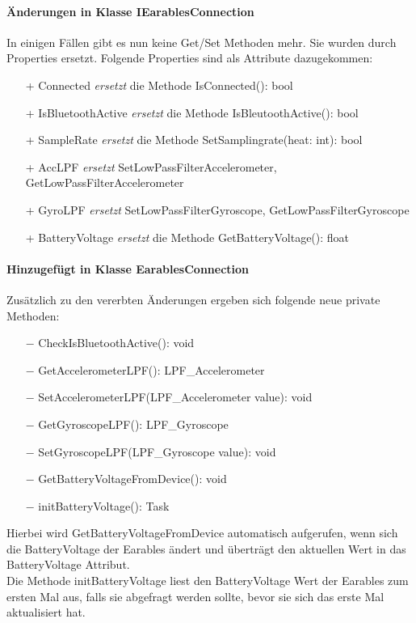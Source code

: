\documentclass[a4paper,12pt]{article}
\begin{document}
\paragraph{Änderungen in Klasse IEarablesConnection}
In einigen Fällen gibt es nun keine Get/Set Methoden mehr. Sie wurden durch Properties ersetzt.
Folgende Properties sind als Attribute dazugekommen:
\begin{itemize}
	\item[+] Connected \textit{ersetzt } die Methode IsConnected(): bool
	\item[+] IsBluetoothActive  \textit{ersetzt } die Methode IsBleutoothActive(): bool
	\item[+] SampleRate  \textit{ersetzt } die Methode SetSamplingrate(heat: int): bool
	\item[+] AccLPF \textit{ersetzt} SetLowPassFilterAccelerometer, GetLowPassFilterAccelerometer
	\item[+] GyroLPF  \textit{ersetzt} SetLowPassFilterGyroscope, GetLowPassFilterGyroscope
	\item[+] BatteryVoltage  \textit{ersetzt } die Methode GetBatteryVoltage(): float
\end{itemize}

\paragraph{Hinzugefügt in Klasse EarablesConnection}
Zusätzlich zu den vererbten Änderungen ergeben sich folgende neue private Methoden:
\begin{itemize}
	\item[$-$] CheckIsBluetoothActive(): void
	\item[$-$] GetAccelerometerLPF(): LPF\_Accelerometer
	\item[$-$] SetAccelerometerLPF(LPF\_Accelerometer value): void
	\item[$-$] GetGyroscopeLPF(): LPF\_Gyroscope
	\item[$-$] SetGyroscopeLPF(LPF\_Gyroscope value): void
	\item[$-$] GetBatteryVoltageFromDevice(): void
	\item[$-$] initBatteryVoltage(): Task
\end{itemize}
  Hierbei wird GetBatteryVoltageFromDevice automatisch aufgerufen, wenn sich die BatteryVoltage der Earables ändert und überträgt den aktuellen Wert in das BatteryVoltage Attribut.\\
  Die Methode initBatteryVoltage liest den BatteryVoltage Wert der Earables zum ersten Mal aus, falls sie abgefragt werden sollte, bevor sie sich das erste Mal aktualisiert hat.
\end{document}
